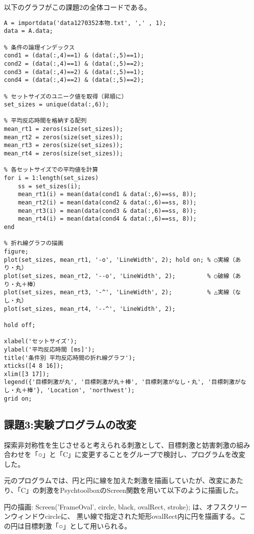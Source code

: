\documentclass{jlreq}
\begin{document}
以下のグラフがこの課題2の全体コードである。
\begin{lstlisting}
A = importdata('data1270352本物.txt', ',' , 1);
data = A.data;

% 条件の論理インデックス
cond1 = (data(:,4)==1) & (data(:,5)==1);
cond2 = (data(:,4)==1) & (data(:,5)==2);
cond3 = (data(:,4)==2) & (data(:,5)==1);
cond4 = (data(:,4)==2) & (data(:,5)==2);

% セットサイズのユニーク値を取得（昇順に）
set_sizes = unique(data(:,6));

% 平均反応時間を格納する配列
mean_rt1 = zeros(size(set_sizes));
mean_rt2 = zeros(size(set_sizes));
mean_rt3 = zeros(size(set_sizes));
mean_rt4 = zeros(size(set_sizes));

% 各セットサイズでの平均値を計算
for i = 1:length(set_sizes)
    ss = set_sizes(i);
    mean_rt1(i) = mean(data(cond1 & data(:,6)==ss, 8));
    mean_rt2(i) = mean(data(cond2 & data(:,6)==ss, 8));
    mean_rt3(i) = mean(data(cond3 & data(:,6)==ss, 8));
    mean_rt4(i) = mean(data(cond4 & data(:,6)==ss, 8));
end

% 折れ線グラフの描画
figure;
plot(set_sizes, mean_rt1, '-o', 'LineWidth', 2); hold on; % ○実線（あり・丸）
plot(set_sizes, mean_rt2, '--o', 'LineWidth', 2);         % ○破線（あり・丸＋棒）
plot(set_sizes, mean_rt3, '-^', 'LineWidth', 2);          % △実線（なし・丸）
plot(set_sizes, mean_rt4, '--^', 'LineWidth', 2);

hold off;

xlabel('セットサイズ');
ylabel('平均反応時間 [ms]');
title('条件別 平均反応時間の折れ線グラフ');
xticks([4 8 16]);
xlim([3 17]);
legend({'目標刺激が丸', '目標刺激が丸＋棒', '目標刺激がなし・丸', '目標刺激がなし・丸＋棒'}, 'Location', 'northwest');
grid on;
\end{lstlisting}
\subsection{課題3:実験プログラムの改変}
探索非対称性を生じさせると考えられる刺激として、目標刺激と妨害刺激の組み合わせを「○」と「C」に変更することをグループで検討し、プログラムを改変した。

元のプログラムでは、円と円に線を加えた刺激を描画していたが、改変にあたり、「C」の刺激をPsychtoolboxのScreen関数を用いて以下のように描画した。

円の描画: Screen('FrameOval', circle, black, ovalRect, stroke); は、オフスクリーンウィンドウcircleに、
黒い線で指定された矩形ovalRect内に円を描画する。この円は目標刺激「○」として用いられる。
\end{document}
